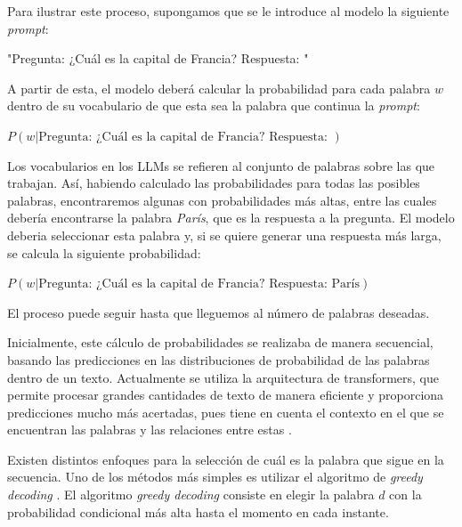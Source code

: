 \documentclass[11pt,spanish,listoffigures,listoftables]{tfgetsinf}
\begin{document}
Para ilustrar este proceso, supongamos que se le introduce al modelo la siguiente \textit{prompt}:

\begin{displayquote}
\centerline{"Pregunta: ¿Cuál es la capital de Francia? Respuesta: "}
\end{displayquote}

A partir de esta, el modelo deberá calcular la probabilidad para cada palabra $w$ dentro de su vocabulario de que esta sea la palabra que continua la \textit{prompt}:

\begin{displayquote}
\centerline{$P(w|\text{Pregunta: ¿Cuál es la capital de Francia? Respuesta: })$}
\end{displayquote}

Los vocabularios en los LLMs se refieren al conjunto de palabras sobre las que trabajan. Así, habiendo calculado las probabilidades para todas las posibles palabras, encontraremos algunas con probabilidades más altas, entre las cuales debería encontrarse la palabra \textit{París}, que es la respuesta a la pregunta. El modelo deberia seleccionar esta palabra y, si se quiere generar una respuesta más larga, se calcula la siguiente probabilidad:

\begin{displayquote}
\centerline{$P(w|\text{Pregunta: ¿Cuál es la capital de Francia? Respuesta: París})$}
\end{displayquote}

El proceso puede seguir hasta que lleguemos al número de palabras deseadas.

Inicialmente, este cálculo de probabilidades se realizaba de manera secuencial, basando las predicciones en las distribuciones de probabilidad de las palabras dentro de un texto. Actualmente se utiliza la arquitectura de transformers, que permite procesar grandes cantidades de texto de manera eficiente y proporciona predicciones mucho más acertadas, pues tiene en cuenta el contexto en el que se encuentran las palabras y las relaciones entre estas \cite{burtsev2023working}.

Existen distintos enfoques para la selección de cuál es la palabra que sigue en la secuencia. Uno de los métodos más simples es utilizar el algoritmo de \textit{greedy decoding} \cite{gu2017trainablegreedydecodingneural}. El algoritmo \textit{greedy decoding} consiste en elegir la palabra $d$ con la probabilidad condicional más alta hasta el momento en cada instante.
\end{document}
